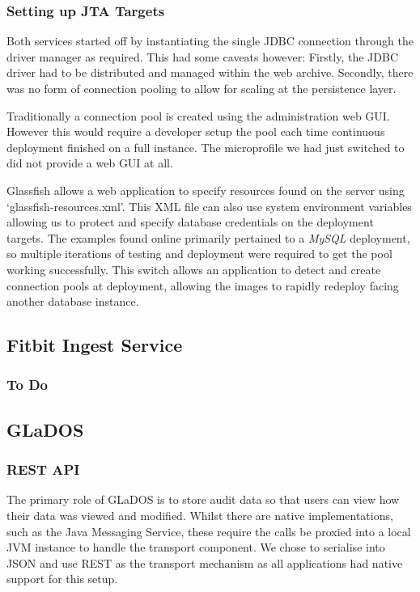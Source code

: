         \label{JTA_Targets}
        \subsubsection{Setting up JTA Targets}
        Both services started off by instantiating the single JDBC connection through the driver manager as required. This had some caveats however: Firstly, the JDBC driver had to be distributed and managed within the web archive. Secondly, there was no form of connection pooling to allow for scaling at the persistence layer.

        \par
        Traditionally a connection pool is created using the administration web GUI. However this would require a developer setup the pool each time continuous deployment finished on a full instance. The microprofile we had just switched to did not provide a web GUI at all.

        \par
        Glassfish allows a web application to specify resources found on the server using `glassfish-resources.xml'. This XML file can also use system environment variables allowing us to protect and specify database credentials on the deployment targets. The examples found online primarily pertained to a \textit{MySQL} deployment, so multiple iterations of testing and deployment were required to get the pool working successfully. This switch allows an application to detect and create connection pools at deployment, allowing the images to rapidly redeploy facing another database instance.

    \subsection{Fitbit Ingest Service}
        \subsubsection{To Do}

    \subsection{GLaDOS}
        \subsubsection{REST API}
        \par
        The primary role of GLaDOS is to store audit data so that users can view how their data was viewed and modified. Whilst there are native implementations, such as the Java Messaging Service, these require the calls be proxied into a local JVM instance to handle the transport component. We chose to serialise into JSON and use REST as the transport mechanism as all applications had native support for this setup.

